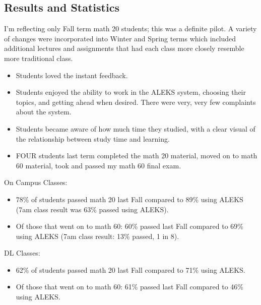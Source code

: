 \subsection{Results and Statistics}
I'm reflecting only Fall term math 20 students; this was a definite pilot.  
A variety of changes were incorporated into Winter and Spring terms 
which included additional lectures and assignments that had each class 
more closely resemble more traditional class.
\begin{itemize}
	\item Students loved the instant feedback.
    \item Students enjoyed the ability to work in the ALEKS system, choosing
      their topics, and getting ahead when desired.  There were very, very few
      complaints about the system.
    \item Students became aware of how much time they studied, with a clear
      visual of the relationship between study time and learning. 
    \item FOUR students last term completed the math 20 material, moved on to
      math 60 material, took and passed my math 60 final exam.
\end{itemize}

On Campus Classes:  
\begin{itemize}
    \item 78\% of students passed math 20 last Fall compared to 89\% using
      ALEKS  (7am class result was 63\% passed using ALEKS).
    \item Of those that went on to math 60:  60\% passed last Fall compared to
      69\% using ALEKS (7am class result: 13\% passed, 1 in 8).
\end{itemize}
DL Classes:
\begin{itemize}
    \item 62\% of students passed math 20 last Fall compared to 71\% using
      ALEKS.
    \item Of those that went on to math 60:  61\% passed last Fall compared to
      46\% using ALEKS.  
\end{itemize}

